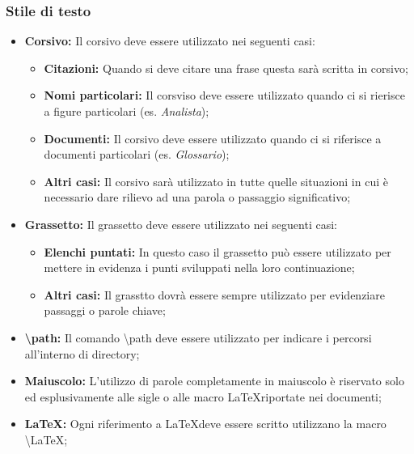       \subsubsection{Stile di testo}
        \begin{itemize}
          \item \textbf{Corsivo: }Il corsivo deve essere utilizzato nei seguenti casi:
            \bgroup
              \begin{itemize}
                \item \textbf{Citazioni: }Quando si deve citare una frase questa sarà scritta in corsivo;
                \item \textbf{Nomi particolari: }Il corsviso deve essere utilizzato quando ci si rierisce a figure particolari (es. \emph{Analista});
                \item \textbf{Documenti: }Il corsivo deve essere utilizzato quando ci si riferisce a documenti particolari (es. \emph{Glossario});
                \item \textbf{Altri casi: }Il corsivo sarà utilizzato in tutte quelle situazioni in cui è necessario dare rilievo ad una parola o passaggio
                significativo;
              \end{itemize}
            \egroup
          \item \textbf{Grassetto: }Il grassetto deve essere utilizzato nei seguenti casi:
            \bgroup
              \begin{itemize}
                \item \textbf{Elenchi puntati: }In questo caso il grassetto può essere utilizzato per mettere in evidenza i punti sviluppati nella loro continuazione;
                \item \textbf{Altri casi: }Il grasstto dovrà essere sempre utilizzato per evidenziare passaggi o parole chiave;
              \end{itemize}
            \egroup
          \item \textbf{\textbackslash path: }Il comando \textbackslash path deve essere utilizzato per indicare i percorsi all'interno di directory;
          \item \textbf{Maiuscolo: }L'utilizzo di parole completamente in maiuscolo è riservato solo ed esplusivamente alle sigle o alle macro \LaTeX riportate
          nei documenti;
          \item \textbf{\LaTeX : }Ogni riferimento a \LaTeX deve essere scritto utilizzano la macro \textbackslash LaTeX;
        \end{itemize}
